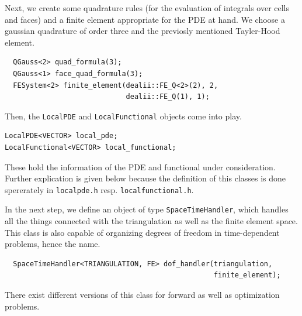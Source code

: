 \documentclass[prodmode,acmtoms]{acmsmall}
\numberwithin{equation}{section}
\begin{document}
Next, we create some quadrature rules (for the evaluation of integrals over cells and faces) and a finite element appropriate for the PDE at hand. We choose a gaussian quadrature of order three and the previosly mentioned Tayler-Hood element. 
\begin{lstlisting}
  QGauss<2> quad_formula(3);
  QGauss<1> face_quad_formula(3);
  FESystem<2> finite_element(dealii::FE_Q<2>(2), 2,
                             dealii::FE_Q(1), 1);
\end{lstlisting}
Then, the \texttt{LocalPDE} and \texttt{LocalFunctional} objects come into play.
\begin{lstlisting}
LocalPDE<VECTOR> local_pde;
LocalFunctional<VECTOR> local_functional;
\end{lstlisting}
These hold the information of the PDE and functional under consideration. Further explication is given below because
the definition of this classes is done spererately in \texttt{localpde.h} resp.   \texttt{localfunctional.h}.

In the next step, we define an object of type \texttt{SpaceTimeHandler}, which handles all the things connected with the triangulation as well as the finite element space. This class is also capable of organizing degrees of freedom in time-dependent problems, hence the name. 
\begin{lstlisting}
  SpaceTimeHandler<TRIANGULATION, FE> dof_handler(triangulation,
                                                  finite_element);
\end{lstlisting}
There exist different versions of this class for forward as well as optimization problems. 
\end{document}

